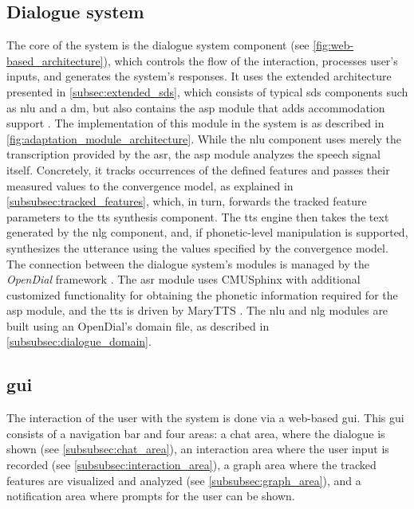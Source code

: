 \subsection{Dialogue system}
\label{subsec:dialogue_system}

The core of the system is the dialogue system component (see \cref{fig:web-based_architecture}), which controls the flow of the interaction, processes user's inputs, and generates the system's responses.
It uses the extended architecture presented in \cref{subsec:extended_sds}, which consists of typical \ac{sds} components such as \ac{nlu} and a \ac{dm}, but also contains the \ac{asp}  module that adds accommodation support \citep{Raveh2017SemDial}.
The implementation of this module in the system is as described in \cref{fig:adaptation_module_architecture}.
While the \ac{nlu} component uses merely the transcription provided by the \ac{asr}, the \ac{asp} module analyzes the speech signal itself.
Concretely, it tracks occurrences of the defined features and passes their measured values to the convergence model, as explained in \cref{subsubsec:tracked_features}, which, in turn, forwards the tracked feature parameters to the \ac{tts} synthesis component.
The \ac{tts} engine then takes the text generated by the \ac{nlg} component, and, if phonetic-level manipulation is supported, synthesizes the utterance using the values specified by the convergence model.
The connection between the dialogue system's modules is managed by the \emph{OpenDial} framework \citep{Lison2016opendial}.
The \ac{asr} module uses CMUSphinx \citep{Lamere2003sphinx} with additional customized functionality for obtaining the phonetic information required for the \ac{asp} module, and the \ac{tts} is driven by MaryTTS \citep{LeMaguer2017uprooted, Schroeder2003mary}.
The \ac{nlu} and \ac{nlg} modules are built using an OpenDial's domain file, as described in \cref{subsubsec:dialogue_domain}.

\subsection{\Acl{gui}}
\label{subsec:graphical_user_interface}


The interaction of the user with the system is done via a web-based \ac{gui}.
This \ac{gui} consists of a navigation bar and four areas:
a chat area, where the dialogue is shown (see \cref{subsubsec:chat_area}),
an interaction area where the user input is recorded (see \cref{subsubsec:interaction_area}),
a graph area where the tracked features are visualized and analyzed (see \cref{subsubsec:graph_area}),
and a notification area where prompts for the user can be shown.

